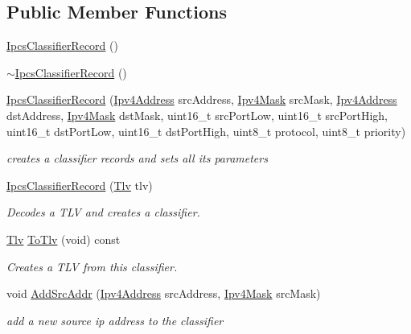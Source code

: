 \subsection*{Public Member Functions}
\begin{DoxyCompactItemize}
\item 
\hyperlink{classns3_1_1IpcsClassifierRecord_aa82334e8306a9a585f66ef81429887b3}{Ipcs\+Classifier\+Record} ()
\item 
\hyperlink{classns3_1_1IpcsClassifierRecord_a3dc5b978e9001318f7cadeebf506d806}{$\sim$\+Ipcs\+Classifier\+Record} ()
\item 
\hyperlink{classns3_1_1IpcsClassifierRecord_a42ad4b285a8e1d4ce754e35dba41567a}{Ipcs\+Classifier\+Record} (\hyperlink{classns3_1_1Ipv4Address}{Ipv4\+Address} src\+Address, \hyperlink{classns3_1_1Ipv4Mask}{Ipv4\+Mask} src\+Mask, \hyperlink{classns3_1_1Ipv4Address}{Ipv4\+Address} dst\+Address, \hyperlink{classns3_1_1Ipv4Mask}{Ipv4\+Mask} dst\+Mask, uint16\+\_\+t src\+Port\+Low, uint16\+\_\+t src\+Port\+High, uint16\+\_\+t dst\+Port\+Low, uint16\+\_\+t dst\+Port\+High, uint8\+\_\+t protocol, uint8\+\_\+t priority)
\begin{DoxyCompactList}\small\item\em creates a classifier records and sets all its parameters \end{DoxyCompactList}\item 
\hyperlink{classns3_1_1IpcsClassifierRecord_a451204bc3818c6a41e575a35ab405791}{Ipcs\+Classifier\+Record} (\hyperlink{classns3_1_1Tlv}{Tlv} tlv)
\begin{DoxyCompactList}\small\item\em Decodes a T\+LV and creates a classifier. \end{DoxyCompactList}\item 
\hyperlink{classns3_1_1Tlv}{Tlv} \hyperlink{classns3_1_1IpcsClassifierRecord_a6ed36b66711176835375cbad80b69fdb}{To\+Tlv} (void) const 
\begin{DoxyCompactList}\small\item\em Creates a T\+LV from this classifier. \end{DoxyCompactList}\item 
void \hyperlink{classns3_1_1IpcsClassifierRecord_aea39f328af19bd0a7462053e124d965d}{Add\+Src\+Addr} (\hyperlink{classns3_1_1Ipv4Address}{Ipv4\+Address} src\+Address, \hyperlink{classns3_1_1Ipv4Mask}{Ipv4\+Mask} src\+Mask)
\begin{DoxyCompactList}\small\item\em add a new source ip address to the classifier \end{DoxyCompactList}\item 

\end{DoxyCompactItemize}
